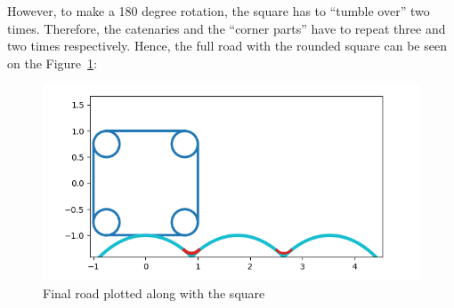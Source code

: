 \documentclass[12pt]{article}
\begin{document}
        However, to make a 180 degree rotation, the square has to ``tumble over'' two times. Therefore, the catenaries and the ``corner parts'' have to repeat three and two times respectively. Hence, the full road with the rounded square can be seen on the Figure~\ref{fig:bridge_final}:
        \begin{figure}[H]
            \includegraphics[width=\linewidth]{images/road_with_square.png}
            \caption{Final road plotted along with the square}\label{fig:bridge_final}
        \end{figure}

    \newpage
    
    
\end{document}

